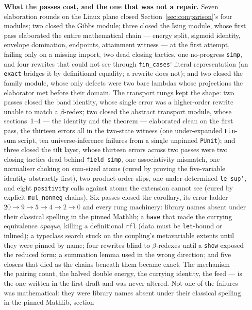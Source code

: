 \documentclass[11pt]{article}
\theoremstyle{definition}
\begin{document}
\textbf{What the passes cost, and the one that was not a repair.}  Seven
elaboration rounds on the Linux plane closed Section~\ref{sec:comparison}'s
four modules; two closed the Gibbs module; three closed the Ising module,
whose first pass elaborated the entire mathematical chain --- energy split,
sigmoid identity, envelope domination, endpoints, attainment witness ---
at the first attempt, failing only on a missing import, two dead closing
tactics, one no-progress \texttt{simp}, and four rewrites that could not see
through \texttt{fin\_cases}' literal representation (an \texttt{exact}
bridges it by definitional equality; a rewrite does not); and two closed the
family module, whose only defects were two bare lambdas whose projections
the elaborator met before their domain.  The transport rungs kept the
shape: two passes closed the band identity, whose single error was a
higher-order rewrite unable to match a $\beta$-redex; two closed the
abstract transport module, whose sections~1--4 --- the identity and the
theorem --- elaborated clean on the first pass, the thirteen errors all in
the two-state witness (one under-expanded \texttt{Fin}-sum script, ten
universe-inference failures from a single unpinned \texttt{PUnit}); and
three closed the tilt layer, whose thirteen errors across two passes were
two closing tactics dead behind \texttt{field\_simp}, one associativity
mismatch, one normaliser choking on sum-sized atoms (cured by proving the
five-variable identity abstractly first), two product-order slips, one
under-determined \texttt{le\_sup'}, and eight \texttt{positivity} calls
against atoms the extension cannot see (cured by explicit
\texttt{mul\_nonneg} chains).  Six passes closed the corollary, its error
ladder $20\to9\to5\to4\to2\to0$ and every rung machinery: library names
absent under their classical spelling in the pinned Mathlib; a
\texttt{have} that made the currying equivalence \emph{opaque}, killing
a definitional \texttt{rfl} (data must be \texttt{let}-bound or inlined);
a typeclass search stuck on the coupling's metavariable extents until
they were pinned by name; four rewrites blind to $\beta$-redexes until a
\texttt{show} exposed the reduced form; a summation lemma used in the
wrong direction; and five closers that died as the chains beneath them
became exact.  The mechanism --- the pairing count, the halved double
energy, the currying identity, the feed --- is the one written in the
first draft and was never altered.  Not one of the failures was mathematical: they were library
names absent under their classical spelling in the pinned Mathlib, section
\end{document}
